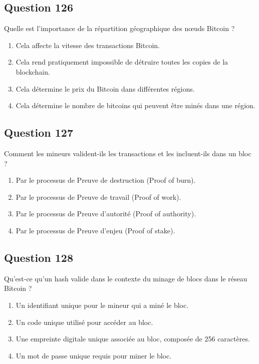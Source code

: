 \documentclass[12pt,a4paper]{article}
\begin{document}
\bigskip


\subsection*{Question 126}
Quelle est l'importance de la répartition géographique des nœuds Bitcoin ?

\begin{enumerate}[label=\Alph*., leftmargin=*]
\item Cela affecte la vitesse des transactions Bitcoin.
\item Cela rend pratiquement impossible de détruire toutes les copies de la blockchain.
\item Cela détermine le prix du Bitcoin dans différentes régions.
\item Cela détermine le nombre de bitcoins qui peuvent être minés dans une région.
\end{enumerate}

\bigskip


\subsection*{Question 127}
Comment les mineurs valident-ils les transactions et les incluent-ils dans un bloc ?

\begin{enumerate}[label=\Alph*., leftmargin=*]
\item Par le processus de Preuve de destruction (Proof of burn).
\item Par le processus de Preuve de travail (Proof of work).
\item Par le processus de Preuve d'autorité (Proof of authority).
\item Par le processus de Preuve d'enjeu (Proof of stake).
\end{enumerate}

\bigskip


\subsection*{Question 128}
Qu'est-ce qu'un hash valide dans le contexte du minage de blocs dans le réseau Bitcoin ?

\begin{enumerate}[label=\Alph*., leftmargin=*]
\item Un identifiant unique pour le mineur qui a miné le bloc.
\item Un code unique utilisé pour accéder au bloc.
\item Une empreinte digitale unique associée au bloc, composée de 256 caractères.
\item Un mot de passe unique requis pour miner le bloc.
\end{enumerate}
\end{document}
